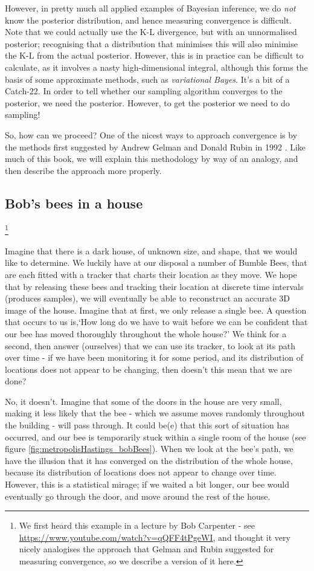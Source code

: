 \documentclass[11pt,fullpage]{book}
\begin{document}
However, in pretty much all applied examples of Bayesian inference, we do \textit{not} know the posterior distribution, and hence measuring convergence is difficult. Note that we could actually use the K-L divergence, but with an unnormalised posterior; recognising that a distribution that minimises this will also minimise the K-L from the actual posterior. However, this is in practice can be difficult to calculate, as it involves a nasty high-dimensional integral, although this forms the basis of some approximate methods, such as \textit{variational Bayes}. It's a bit of a Catch-22. In order to tell whether our sampling algorithm converges to the posterior, we need the posterior. However, to get the posterior we need to do sampling!

So, how can we proceed? One of the nicest ways to approach convergence is by the methods first suggested by Andrew Gelman and Donald Rubin in 1992 \cite{gelman1992inference}. Like much of this book, we will explain this methodology by way of an analogy, and then describe the approach more properly.

\subsection{Bob's bees in a house}\footnote{We first heard this example in a lecture by Bob Carpenter - see \url{https://www.youtube.com/watch?v=qQFF4tPgeWI}, and thought it very nicely analogises the approach that Gelman and Rubin suggested for measuring convergence, so we describe a version of it here.}

Imagine that there is a dark house, of unknown size, and shape, that we would like to determine. We luckily have at our disposal a number of Bumble Bees, that are each fitted with a tracker that charts their location as they move. We hope that by releasing these bees and tracking their location at discrete time intervals (produces samples), we will eventually be able to reconstruct an accurate 3D image of the house. Imagine that at first, we only release a single bee. A question that occurs to us is,`How long do we have to wait before we can be confident that our bee has moved thoroughly throughout the whole house?' We think for a second, then answer (ourselves) that we can use its tracker, to look at its path over time - if we have been monitoring it for some period, and its distribution of locations does not appear to be changing, then doesn't this mean that we are done? 

No, it doesn't. Imagine that some of the doors in the house are very small, making it less likely that the bee - which we assume moves randomly throughout the building - will pass through. It could be(e) that this sort of situation has occurred, and our bee is temporarily stuck within a single room of the house (see figure \ref{fig:metropolisHastings_bobBees}). When we look at the bee's path, we have the illusion that it has converged on the distribution of the whole house, because its distribution of locations does not appear to change over time. However, this is a statistical mirage; if we waited a bit longer, our bee would eventually go through the door, and move around the rest of the house.
\end{document}
